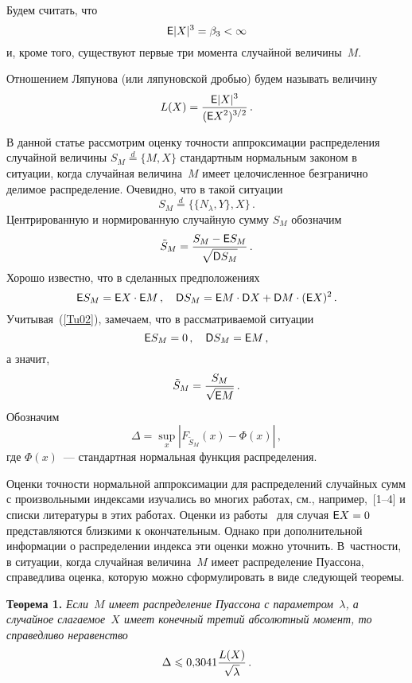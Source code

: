 \begin{multicols}{2}
Будем считать, что
\begin{equation}
 {\sf E} |X|^3=\beta_3<\infty
 \label{Tu07}
\end{equation}
и, кроме того, существуют первые три момента случайной величины~$M$.

Отношением Ляпунова (или ляпуновской \mbox{дробью}) будем называть
величину
$$
L(X) = \displaystyle\frac{\displaystyle {\sf E} |X|^3\mathstrut}{\displaystyle ({\sf E} X^2)^{3/2}\mathstrut}\,.
$$

В данной статье рассмотрим оценку точности аппроксимации
распределения случайной величины $S_M \stackrel{d}{=}  \{M,X\}$
стандартным нормальным законом в ситуации, когда случайная
величина~$M$ имеет целочисленное безгранично делимое
распределение. Очевидно, что в такой ситуации
\begin{equation}
S_M \stackrel{d}{=} \{\{N_{\lambda},Y\},X\}\,.
\label{gp1}
\end{equation}
Центрированную и нормированную случайную сумму $S_M$ обозначим
$$
\tilde{S}_M = \displaystyle\frac{\displaystyle S_M - {\sf E} S_M\mathstrut}{\displaystyle \sqrt{{\sf D} S_M}\mathstrut}\,.
$$
Хорошо известно, что в сделанных предположениях
$$
{\sf E} S_M ={\sf E} X\cdot {\sf E} M\,,\quad {\sf D} S_M = {\sf E} M \cdot {\sf D} X + {\sf D} M
\cdot ({\sf E} X)^2\,.
$$
Учитывая~(\ref{Tu02}), замечаем, что в рассматриваемой ситуации
\begin{equation}
\label{Tu043} {\sf E} S_M =0\,,\quad {\sf D} S_M = {\sf E} M\,,
\end{equation}
а значит,
$$
\tilde{S}_M = \displaystyle\frac{\displaystyle S_M\mathstrut}{\displaystyle \sqrt{{\sf E} M}\mathstrut}\,.
$$
Обозначим
$$
\Delta = \sup\limits_x\left|F_{\tilde{S}_M}(x) - \Phi(x)\right|\,,
$$
где $\Phi(x)$~--- стандартная нормальная функция распределения.

Оценки точности нормальной аппроксимации для распределений
случайных сумм с произвольными индексами изучались во многих
работах, см., например,~[1--4] и списки литературы в
этих работах. Оценки из работы~\cite{6g} для случая ${\sf E} X = 0$
представляются близкими к окончательным. Однако при дополнительной
информации о распределении индекса эти оценки можно уточнить. 
В~част\-ности, в ситуации, когда случайная величина~$M$ имеет
распределение Пуассона, справедлива оценка, которую можно
сформулировать в виде следующей теоремы.

\medskip

\noindent
\textbf{Теорема 1.}
\textit{Если~$M$ имеет распределение Пуассона с параметром~$\lambda$, а
случайное слагаемое~$X$ имеет конечный третий абсолютный момент,
то справедливо неравенство}
\begin{equation}
\label{Tu05} \Delta \leqslant 0{,}3041\displaystyle\frac{\displaystyle L(X)\mathstrut}{\displaystyle \sqrt{\lambda}\mathstrut}\,.
\end{equation}



\end{multicols}
